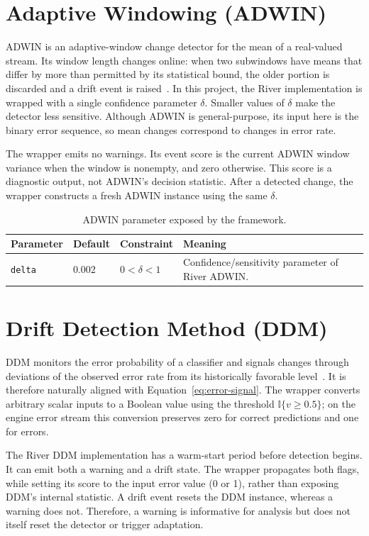 \section{Adaptive Windowing (ADWIN)}
\label{sec:adwin}

ADWIN is an adaptive-window change detector for the mean of a real-valued stream. Its window length changes online: when two subwindows have means that differ by more than permitted by its statistical bound, the older portion is discarded and a drift event is raised~\cite{bifet2007adwin}. In this project, the River implementation is wrapped with a single confidence parameter $\delta$. Smaller values of $\delta$ make the detector less sensitive. Although ADWIN is general-purpose, its input here is the binary error sequence, so mean changes correspond to changes in error rate.

The wrapper emits no warnings. Its event score is the current ADWIN window variance when the window is nonempty, and zero otherwise. This score is a diagnostic output, not ADWIN's decision statistic. After a detected change, the wrapper constructs a fresh ADWIN instance using the same $\delta$.

\begin{table}[htbp]
\centering
\caption{ADWIN parameter exposed by the framework.}
\label{tab:adwin-parameters}
\begin{tabular}{@{}llll@{}}
\toprule
Parameter & Default & Constraint & Meaning \\
\midrule
\texttt{delta} & 0.002 & $0<\delta<1$ & Confidence/sensitivity parameter of River ADWIN. \\
\bottomrule
\end{tabular}
\end{table}

\section{Drift Detection Method (DDM)}
\label{sec:ddm}

DDM monitors the error probability of a classifier and signals changes through deviations of the observed error rate from its historically favorable level~\cite{gama2004ddm}. It is therefore naturally aligned with Equation~\eqref{eq:error-signal}. The wrapper converts arbitrary scalar inputs to a Boolean value using the threshold $\mathbb{I}\{v\geq0.5\}$; on the engine error stream this conversion preserves zero for correct predictions and one for errors.

The River DDM implementation has a warm-start period before detection begins. It can emit both a warning and a drift state. The wrapper propagates both flags, while setting its score to the input error value (0 or 1), rather than exposing DDM's internal statistic. A drift event resets the DDM instance, whereas a warning does not. Therefore, a warning is informative for analysis but does not itself reset the detector or trigger adaptation.

